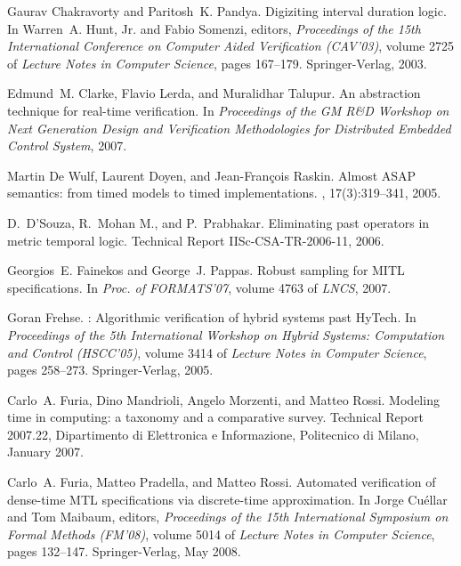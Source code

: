 \documentclass[a4paper]{article}
\theoremstyle{plain}
\theoremstyle{definition}
\begin{document}
\begin{thebibliography}{10}
Gaurav Chakravorty and Paritosh~K. Pandya.
\newblock Digiziting interval duration logic.
\newblock In Warren~A. {Hunt, Jr.} and Fabio Somenzi, editors, {\em Proceedings
  of the 15th International Conference on Computer Aided Verification
  (CAV'03)}, volume 2725 of {\em Lecture Notes in Computer Science}, pages
  167--179. Springer-Verlag, 2003.

Edmund~M. Clarke, Flavio Lerda, and Muralidhar Talupur.
\newblock An abstraction technique for real-time verification.
\newblock In {\em Proceedings of the GM R\&D Workshop on Next Generation Design
  and Verification Methodologies for Distributed Embedded Control System},
  2007.

Martin {De Wulf}, Laurent Doyen, and Jean-Fran{\c c}ois Raskin.
\newblock Almost {ASAP} semantics: from timed models to timed implementations.
, 17(3):319--341, 2005.

D.~D'Souza, R.~{Mohan M.}, and P.~Prabhakar.
\newblock Eliminating past operators in metric temporal logic.
\newblock Technical Report IISc-CSA-TR-2006-11, 2006.

Georgios~E. Fainekos and George~J. Pappas.
\newblock Robust sampling for {MITL} specifications.
\newblock In {\em Proc. of FORMATS'07}, volume 4763 of {\em LNCS}, 2007.

Goran Frehse.
: Algorithmic verification of hybrid systems past {HyTech}.
\newblock In {\em Proceedings of the 5th International Workshop on Hybrid
  Systems: Computation and Control (HSCC'05)}, volume 3414 of {\em Lecture
  Notes in Computer Science}, pages 258--273. Springer-Verlag, 2005.

Carlo~A. Furia, Dino Mandrioli, Angelo Morzenti, and Matteo Rossi.
\newblock Modeling time in computing: a taxonomy and a comparative survey.
\newblock Technical Report 2007.22, Dipartimento di Elettronica e Informazione,
  Politecnico di Milano, January 2007.

Carlo~A. Furia, Matteo Pradella, and Matteo Rossi.
\newblock Automated verification of dense-time {MTL} specifications via
  discrete-time approximation.
\newblock In Jorge Cu{\'e}llar and Tom Maibaum, editors, {\em Proceedings of
  the 15th International Symposium on Formal Methods (FM'08)}, volume 5014 of
  {\em Lecture Notes in Computer Science}, pages 132--147. Springer-Verlag, May
  2008.


\end{thebibliography}
\end{document}
